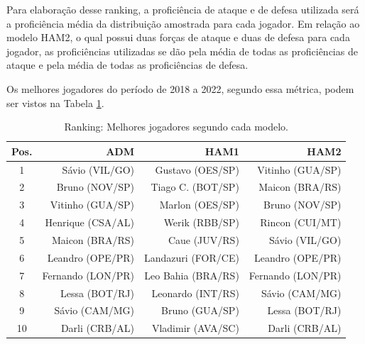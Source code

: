 Para elaboração desse ranking, a proficiência de ataque e de defesa utilizada será a proficiência média da distribuição amostrada para cada jogador. Em relação ao modelo HAM2, o qual possui duas forças de ataque e duas de defesa para cada jogador, as proficiências utilizadas se dão pela média de todas as proficiências de ataque e pela média de todas as proficiências de defesa.

Os melhores jogadores do período de 2018 a 2022, segundo essa métrica, podem ser vistos na Tabela \ref{ranking}.
\begin{table}[H]
    \centering
    \begin{tabular}{c|rrr}
        \hline
        Pos. & ADM               & HAM1               & HAM2              \\ \hline
        1    & Sávio (VIL/GO)    & Gustavo (OES/SP)   & Vitinho (GUA/SP)  \\
        2    & Bruno (NOV/SP)    & Tiago C. (BOT/SP)  & Maicon (BRA/RS)   \\
        3    & Vitinho (GUA/SP)  & Marlon (OES/SP)    & Bruno (NOV/SP)    \\
        4    & Henrique (CSA/AL) & Werik (RBB/SP)     & Rincon (CUI/MT)   \\
        5    & Maicon (BRA/RS)   & Caue (JUV/RS)      & Sávio (VIL/GO)    \\
        6    & Leandro (OPE/PR)  & Landazuri (FOR/CE) & Leandro (OPE/PR)  \\
        7    & Fernando (LON/PR) & Leo Bahia (BRA/RS) & Fernando (LON/PR) \\
        8    & Lessa (BOT/RJ)    & Leonardo (INT/RS)  & Sávio (CAM/MG)    \\
        9    & Sávio (CAM/MG)    & Bruno (GUA/SP)     & Lessa (BOT/RJ)    \\
        10   & Darli (CRB/AL)    & Vladimir (AVA/SC)  & Darli (CRB/AL)    \\ \hline
    \end{tabular}
    \caption{Ranking: Melhores jogadores segundo cada modelo.}
    \label{ranking}
\end{table}

